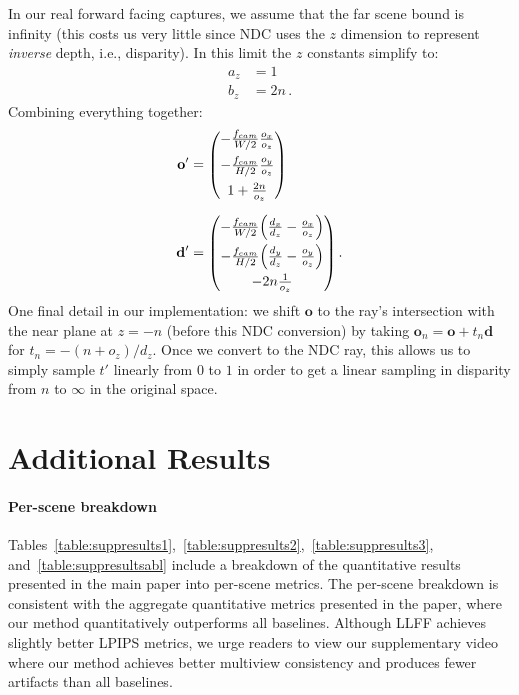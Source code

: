 \documentclass[runningheads]{llncs}
\let\originalleft\left
\let\originalright\right
\renewcommand{\left}{\mathopen{}\mathclose\bgroup\originalleft}
\renewcommand{\right}{\aftergroup\egroup\originalright}
\begin{document}
In our real forward facing captures, we assume that the far scene bound is infinity (this costs us very little since NDC uses the $z$ dimension to represent \emph{inverse} depth, i.e., disparity). In this limit the $z$ constants simplify to:
\begin{align}
    a_z &= 1 \\
    b_z &= 2n \, .
\end{align}
Combining everything together:
\begin{align}
    \mathbf o' &= 
    \begin{pmatrix}
        -\frac{f_{cam}}{W/2} \frac{o_x}{o_z} \\[6pt]
        -\frac{f_{cam}}{H/2} \frac{o_y}{o_z} \\[6pt]
        1 + \frac{2n}{o_z}
    \end{pmatrix}
    \\[6pt]
    \mathbf d' &= 
    \begin{pmatrix}
        -\frac{f_{cam}}{W/2} \left(\frac{d_x}{d_z} - \frac{o_x}{o_z}\right) \\[6pt]
        -\frac{f_{cam}}{H/2} \left(\frac{d_y}{d_z} - \frac{o_y}{o_z}\right) \\[6pt]
        -2n \frac{1}{o_z}
    \end{pmatrix} \, .
\end{align}
One final detail in our implementation: we shift $\mathbf o$ to the ray's intersection with the near plane at $z=-n$ (before this NDC conversion) by taking $\mathbf o_n = \mathbf o + t_n \mathbf d$ for $t_n = -(n + o_z) / d_z$. Once we convert to the NDC ray, this allows us to simply sample $t'$ linearly from $0$ to $1$ in order to get a linear sampling in disparity from $n$ to $\infty$ in the original space.


\section{Additional Results}

\paragraph{\textbf{Per-scene breakdown}}
Tables~\ref{table:suppresults1},~\ref{table:suppresults2},~\ref{table:suppresults3}, and~\ref{table:suppresultsabl} include a breakdown of the quantitative results presented in the main paper into per-scene metrics. The per-scene breakdown is consistent with the aggregate quantitative metrics presented in the paper, where our method quantitatively outperforms all baselines. Although LLFF achieves slightly better LPIPS metrics, we urge readers to view our supplementary video where our method achieves better multiview consistency and produces fewer artifacts than all baselines. 
\end{document}
